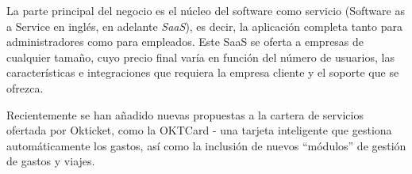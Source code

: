 La parte principal del negocio es el núcleo del software como servicio (Software as a
Service en inglés, en adelante \textit{SaaS}), es decir, la aplicación completa tanto
para administradores como para empleados. Este SaaS se oferta a empresas de cualquier
tamaño, cuyo precio final varía en función del número de usuarios, las características
e integraciones que requiera la empresa cliente y el soporte que se ofrezca.

Recientemente se han añadido nuevas propuestas a la cartera de servicios ofertada por
Okticket, como la OKTCard {-} una tarjeta inteligente que gestiona automáticamente los gastos,
así como la inclusión de nuevos ``módulos'' de gestión de gastos y viajes.
